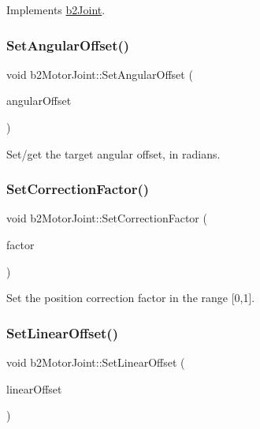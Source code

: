 Implements \mbox{\hyperlink{classb2_joint_a599c013de5514e02684b958b31dd76a4}{b2\+Joint}}.

\mbox{\label{classb2_motor_joint_a14d7dca1767548ddffe293e39cafc3c7}} 
\subsubsection{\texorpdfstring{SetAngularOffset()}{SetAngularOffset()}}
{\footnotesize\ttfamily void b2\+Motor\+Joint\+::\+Set\+Angular\+Offset (\begin{DoxyParamCaption}\item[{\mbox{\hyperlink{b2_settings_8h_aacdc525d6f7bddb3ae95d5c311bd06a1}{float32}}}]{angular\+Offset }\end{DoxyParamCaption})}



Set/get the target angular offset, in radians. 

\mbox{\label{classb2_motor_joint_ae59e624b8a7b6f869ab5e6148352cb52}} 
\subsubsection{\texorpdfstring{SetCorrectionFactor()}{SetCorrectionFactor()}}
{\footnotesize\ttfamily void b2\+Motor\+Joint\+::\+Set\+Correction\+Factor (\begin{DoxyParamCaption}\item[{\mbox{\hyperlink{b2_settings_8h_aacdc525d6f7bddb3ae95d5c311bd06a1}{float32}}}]{factor }\end{DoxyParamCaption})}



Set the position correction factor in the range \mbox{[}0,1\mbox{]}. 

\mbox{\label{classb2_motor_joint_a99254b5fc9ed9f2d0fdccada513000c3}} 
\subsubsection{\texorpdfstring{SetLinearOffset()}{SetLinearOffset()}}
{\footnotesize\ttfamily void b2\+Motor\+Joint\+::\+Set\+Linear\+Offset (\begin{DoxyParamCaption}\item[{const \mbox{\hyperlink{structb2_vec2}{b2\+Vec2}} \&}]{linear\+Offset }\end{DoxyParamCaption})}



